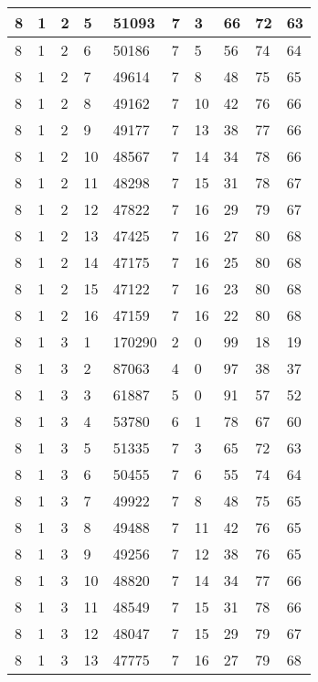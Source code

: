 \begin{table}[!ht]
\begin{tabular}{|l|l|l|l|l|l|l|l|l|l|}
        8 & 1 & 2 & 5 & 51093 & 7 & 3 & 66 & 72 & 63 \\ \hline
        8 & 1 & 2 & 6 & 50186 & 7 & 5 & 56 & 74 & 64 \\ \hline
        8 & 1 & 2 & 7 & 49614 & 7 & 8 & 48 & 75 & 65 \\ \hline
        8 & 1 & 2 & 8 & 49162 & 7 & 10 & 42 & 76 & 66 \\ \hline
        8 & 1 & 2 & 9 & 49177 & 7 & 13 & 38 & 77 & 66 \\ \hline
        8 & 1 & 2 & 10 & 48567 & 7 & 14 & 34 & 78 & 66 \\ \hline
        8 & 1 & 2 & 11 & 48298 & 7 & 15 & 31 & 78 & 67 \\ \hline
        8 & 1 & 2 & 12 & 47822 & 7 & 16 & 29 & 79 & 67 \\ \hline
        8 & 1 & 2 & 13 & 47425 & 7 & 16 & 27 & 80 & 68 \\ \hline
        8 & 1 & 2 & 14 & 47175 & 7 & 16 & 25 & 80 & 68 \\ \hline
        8 & 1 & 2 & 15 & 47122 & 7 & 16 & 23 & 80 & 68 \\ \hline
        8 & 1 & 2 & 16 & 47159 & 7 & 16 & 22 & 80 & 68 \\ \hline
        8 & 1 & 3 & 1 & 170290 & 2 & 0 & 99 & 18 & 19 \\ \hline
        8 & 1 & 3 & 2 & 87063 & 4 & 0 & 97 & 38 & 37 \\ \hline
        8 & 1 & 3 & 3 & 61887 & 5 & 0 & 91 & 57 & 52 \\ \hline
        8 & 1 & 3 & 4 & 53780 & 6 & 1 & 78 & 67 & 60 \\ \hline
        8 & 1 & 3 & 5 & 51335 & 7 & 3 & 65 & 72 & 63 \\ \hline
        8 & 1 & 3 & 6 & 50455 & 7 & 6 & 55 & 74 & 64 \\ \hline
        8 & 1 & 3 & 7 & 49922 & 7 & 8 & 48 & 75 & 65 \\ \hline
        8 & 1 & 3 & 8 & 49488 & 7 & 11 & 42 & 76 & 65 \\ \hline
        8 & 1 & 3 & 9 & 49256 & 7 & 12 & 38 & 76 & 65 \\ \hline
        8 & 1 & 3 & 10 & 48820 & 7 & 14 & 34 & 77 & 66 \\ \hline
        8 & 1 & 3 & 11 & 48549 & 7 & 15 & 31 & 78 & 66 \\ \hline
        8 & 1 & 3 & 12 & 48047 & 7 & 15 & 29 & 79 & 67 \\ \hline
        8 & 1 & 3 & 13 & 47775 & 7 & 16 & 27 & 79 & 68 \\ \hline

\end{tabular}
\end{table}
